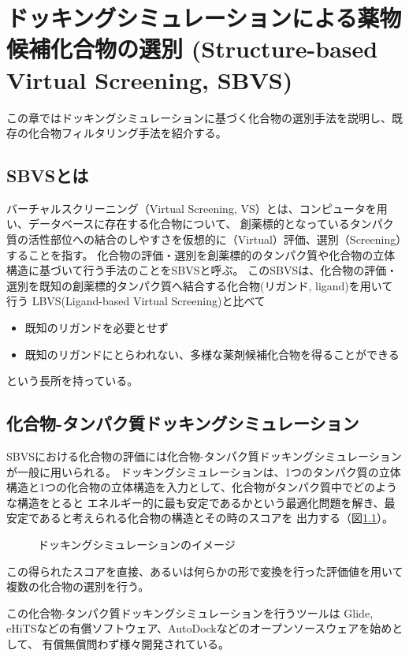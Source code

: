 \chapter{ドッキングシミュレーションによる薬物候補化合物の選別 (Structure-based Virtual Screening, SBVS)}
この章ではドッキングシミュレーションに基づく化合物の選別手法を説明し、既存の化合物フィルタリング手法を紹介する。

\section{SBVSとは}
バーチャルスクリーニング（Virtual Screening, VS）とは、コンピュータを用い、データベースに存在する化合物について、
創薬標的となっているタンパク質の活性部位への結合のしやすさを仮想的に（Virtual）評価、選別（Screening）することを指す。
化合物の評価・選別を創薬標的のタンパク質や化合物の立体構造に基づいて行う手法のことをSBVSと呼ぶ。
このSBVSは、化合物の評価・選別を既知の創薬標的タンパク質へ結合する化合物(リガンド, ligand)を用いて行う
LBVS(Ligand-based Virtual Screening)と比べて
\begin{itemize}
\item 既知のリガンドを必要とせず
\item 既知のリガンドにとらわれない、多様な薬剤候補化合物を得ることができる
\end{itemize}
という長所を持っている。

\section{化合物-タンパク質ドッキングシミュレーション}
SBVSにおける化合物の評価には化合物-タンパク質ドッキングシミュレーションが一般に用いられる。
ドッキングシミュレーションは、1つのタンパク質の立体構造と1つの化合物の立体構造を入力として、化合物がタンパク質中でどのような構造をとると
エネルギー的に最も安定であるかという最適化問題を解き、最安定であると考えられる化合物の構造とその時のスコアを
出力する（図\ref{fig:docking}）。
\begin{figure}[tb]
 \begin{center}
  \caption{ドッキングシミュレーションのイメージ}
  \label{fig:docking}
 \end{center}
\end{figure}
この得られたスコアを直接、あるいは何らかの形で変換を行った評価値を用いて複数の化合物の選別を行う。

この化合物-タンパク質ドッキングシミュレーションを行うツールは
Glide\cite{Friesner2004}, eHiTS\cite{Zsoldos2007}などの有償ソフトウェア、AutoDock\cite{Morris2009}などのオープンソースウェアを始めとして、
有償無償問わず様々開発されている。


